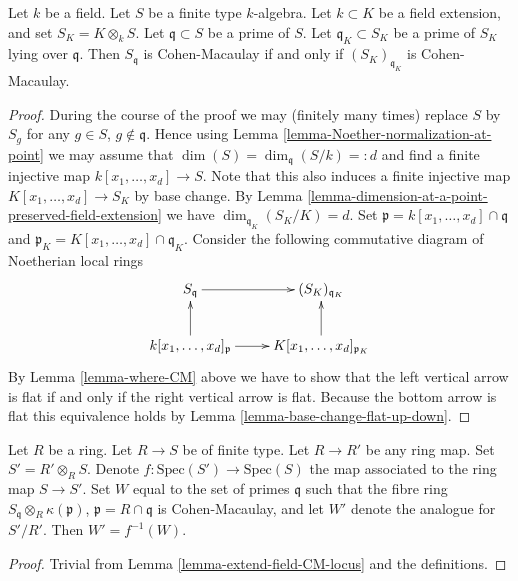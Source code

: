\begin{lemma}
\label{lemma-extend-field-CM-locus}
Let $k$ be a field. Let $S$ be a finite type $k$-algebra.
Let $k \subset K$ be a field extension, and set $S_K = K\otimes_k S$.
Let $\mathfrak q \subset S$ be a prime of $S$.
Let $\mathfrak q_K \subset S_K$ be a prime of $S_K$ lying
over $\mathfrak q$. Then $S_{\mathfrak q}$ is Cohen-Macaulay
if and only if $(S_K)_{\mathfrak q_K}$ is Cohen-Macaulay.
\end{lemma}

\begin{proof}
During the course of the proof we may (finitely many times) replace
$S$ by $S_g$ for any $g \in S$, $g \not \in \mathfrak q$. Hence
using Lemma \ref{lemma-Noether-normalization-at-point} we may
assume that $\dim(S) = \dim_{\mathfrak q}(S/k) =: d$ and
find a finite injective map $k[x_1, \ldots, x_d] \to S$.
Note that this also induces a finite injective map
$K[x_1, \ldots, x_d] \to S_K$ by base change.
By Lemma \ref{lemma-dimension-at-a-point-preserved-field-extension}
we have $\dim_{\mathfrak q_K}(S_K/K) = d$.
Set $\mathfrak p = k[x_1, \ldots, x_d] \cap \mathfrak q$
and $\mathfrak p_K = K[x_1, \ldots, x_d] \cap \mathfrak q_K$.
Consider the following commutative diagram of Noetherian local
rings
$$
\xymatrix{
S_{\mathfrak q} \ar[r] & 
(S_K)_{\mathfrak q_K} \\
k[x_1, \ldots, x_d]_{\mathfrak p} \ar[r] \ar[u] &
K[x_1, \ldots, x_d]_{\mathfrak p_K} \ar[u]
}
$$
By Lemma \ref{lemma-where-CM} above we have to show that
the left vertical arrow is flat if and only if the right
vertical arrow is flat. Because the bottom arrow is flat
this equivalence holds by Lemma \ref{lemma-base-change-flat-up-down}.
\end{proof}

\begin{lemma}
\label{lemma-CM-locus-commutes-base-change}
Let $R$ be a ring. Let $R \to S$ be of finite type.
Let $R \to R'$ be any ring map. Set $S' = R' \otimes_R S$.
Denote $f : \text{Spec}(S') \to \text{Spec}(S)$ the map
associated to the ring map $S \to S'$.
Set $W$ equal to the 
set of primes $\mathfrak q$ such that the fibre ring
$S_{\mathfrak q} \otimes_R \kappa(\mathfrak p)$,
$\mathfrak p = R \cap \mathfrak q$ is Cohen-Macaulay,
and let $W'$ denote the analogue for $S'/R'$. Then
$W' = f^{-1}(W)$.
\end{lemma}

\begin{proof}
Trivial from Lemma \ref{lemma-extend-field-CM-locus} and the definitions.
\end{proof}

